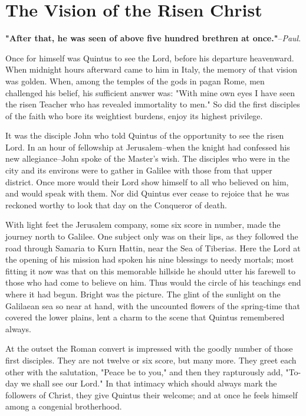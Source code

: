 \chapter*{The Vision of the Risen Christ}
\textbf{"After that, he was seen of above five hundred brethren at
once."}--\textit{Paul}.


Once for himself was Quintus to see the Lord, before his departure
heavenward.  When midnight hours afterward came to him in Italy,
the memory of that vision was golden.  When, among the temples of
the gods in pagan Rome, men challenged his belief, his sufficient
answer was: "With mine own eyes I have seen the risen Teacher who
has revealed immortality to men."  So did the first disciples of
the faith who bore its weightiest burdens, enjoy its highest
privilege.

It was the disciple John who told Quintus of the opportunity to see
the risen Lord.  In an hour of fellowship at Jerusalem--when the
knight had confessed his new allegiance--John spoke of the Master's
wish.  The disciples who were in the city and its environs were to
gather in Galilee with those from that upper district.  Once more
would their Lord show himself to all who believed on him, and would
speak with them.  Nor did Quintus ever cease to rejoice that he was
reckoned worthy to look that day on the Conqueror of death.

With light feet the Jerusalem company, some six score in number,
made the journey north to Galilee.  One subject only was on their
lips, as they followed the road through Samaria to Kurn Hattin,
near the Sea of Tiberias.  Here the Lord at the opening of his
mission had spoken his nine blessings to needy mortals; most
fitting it now was that on this memorable hillside he should utter
his farewell to those who had come to believe on him.  Thus would
the circle of his teachings end where it had begun.  Bright was the
picture.  The glint of the sunlight on the Galilaean sea so near at
hand, with the uncounted flowers of the spring-time that covered
the lower plains, lent a charm to the scene that Quintus remembered
always.


At the outset the Roman convert is impressed with the goodly number
of those first disciples.  They are not twelve or six score, but
many more.  They greet each other with the salutation, "Peace be to
you," and then they rapturously add, "To-day we shall see our
Lord."  In that intimacy which should always mark the followers of
Christ, they give Quintus their welcome; and at once he feels
himself among a congenial brotherhood.

